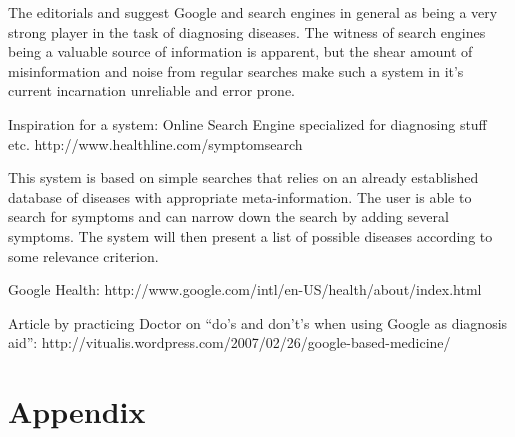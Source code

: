 \documentclass[10pt,letterpaper,final]{article}
\begin{document}
The editorials \cite{googlechangemedicine} and
\cite{diagnosissearchengines} suggest Google and search engines in
general as being a very strong player in the task of diagnosing
diseases. The witness of search engines being a valuable source of
information is apparent, but the shear amount of misinformation and
noise from regular searches make such a system in it’s current
incarnation unreliable and error prone.


Inspiration for a system: Online Search Engine specialized for
diagnosing stuff etc.
http://www.healthline.com/symptomsearch

This system is based on simple searches that relies on an already
established database of diseases with appropriate meta-information. The
user is able to search for symptoms and can narrow down the search by
adding several symptoms. The system will then present a list of possible
diseases according to some relevance criterion.



Google Health: http://www.google.com/intl/en-US/health/about/index.html


Article by practicing Doctor on “do’s and don’t’s when using Google as
diagnosis aid”:
http://vitualis.wordpress.com/2007/02/26/google-based-medicine/


\appendix
\section{Appendix}

\renewcommand\bibname{References}


\end{document}
